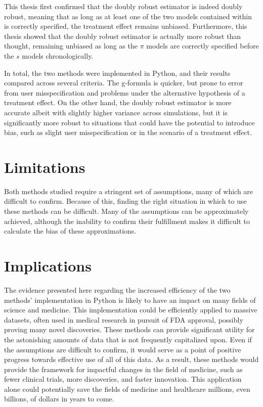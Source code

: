 This thesis first confirmed that the doubly robust estimator is indeed doubly robust, meaning that as long as at least one of the two models contained within is correctly specified, the treatment effect remains unbiased.  Furthermore, this thesis showed that the doubly robust estimator is actually more robust than thought, remaining unbiased as long as the $\pi$ models are correctly specified before the $s$ models chronologically.  

In total, the two methods were implemented in Python, and their results compared across several criteria.  The g-formula is quicker, but prone to error from user misspecification and problems under the alternative hypothesis of a treatment effect.  On the other hand, the doubly robust estimator is more accurate albeit with slightly higher variance across simulations, but it is significantly more robust to situations that could have the potential to introduce bias, such as slight user misspecification or in the scenario of a treatment effect.  

\section{Limitations}
Both methods studied require a stringent set of assumptions, many of which are difficult to confirm.  Because of this, finding the right situation in which to use these methods can be difficult.  Many of the assumptions can be approximately achieved, although the inability to confirm their fulfillment makes it difficult to calculate the bias of these approximations.  

\section{Implications}
The evidence presented here regarding the increased efficiency of the two methods' implementation in Python is likely to have an impact on many fields of science and medicine.  This implementation could be efficiently applied to massive datasets, often used in medical research in pursuit of FDA approval, possibly proving many novel discoveries.  These methods can provide significant utility for the astonishing amounts of data that is not frequently capitalized upon.  Even if the assumptions are difficult to confirm, it would serve as a point of positive progress towards effective use of all of this data.  As a result, these methods would provide the framework for impactful changes in the field of medicine, such as fewer clinical trials, more discoveries, and faster innovation.  This application alone could potentially save the fields of medicine and healthcare millions, even billions, of dollars in years to come. 

